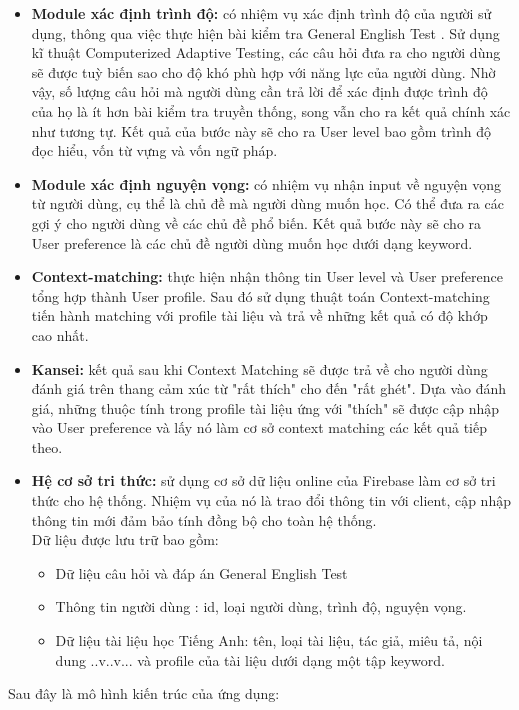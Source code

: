 \begin{itemize}
	\item \textbf{Module xác định trình độ:} có nhiệm vụ xác định trình độ của người sử dụng, thông qua việc thực hiện bài kiểm tra General English Test . Sử dụng kĩ thuật Computerized Adaptive Testing, các câu hỏi đưa ra cho người dùng sẽ được tuỳ biến sao cho độ khó phù hợp với năng lực của người dùng. Nhờ vậy, số lượng câu hỏi mà người dùng cần trả lời để xác định được trình độ của họ là ít hơn bài kiểm tra truyền thống, song vẫn cho ra kết quả chính xác như tương tự. Kết quả của bước này sẽ cho ra User level bao gồm trình độ đọc hiểu, vốn từ vựng và vốn ngữ pháp.
	\item \textbf{Module xác định nguyện vọng:} có nhiệm vụ nhận input về nguyện vọng từ người dùng, cụ thể là chủ đề mà người dùng muốn học. Có thể đưa ra các gợi ý cho người dùng về các chủ đề phổ biến. Kết quả bước này sẽ cho ra User preference là các chủ đề người dùng muốn học dưới dạng keyword.
	\item \textbf{Context-matching:} thực hiện nhận thông tin User level và User preference tổng hợp thành User profile. Sau đó sử dụng thuật toán Context-matching tiến hành matching với profile tài liệu và trả về những kết quả có độ khớp cao nhất.
	\item \textbf{Kansei:} kết quả sau khi Context Matching sẽ được trả về cho người dùng đánh giá trên thang cảm xúc từ "rất thích" cho đến "rất ghét". Dựa vào đánh giá, những thuộc tính trong profile tài liệu ứng với "thích" sẽ được cập nhập vào User preference và lấy nó làm cơ sở context matching các kết quả tiếp theo.
	\item \textbf{Hệ cơ sở tri thức:} sử dụng cơ sở dữ liệu online của Firebase làm cơ sở tri thức cho hệ thống. Nhiệm vụ của nó là trao đổi thông tin với client, cập nhập thông tin mới đảm bảo tính đồng bộ cho toàn hệ thống. \\Dữ liệu được lưu trữ bao gồm:
		\begin{itemize}
			\item Dữ liệu câu hỏi và đáp án General English Test
			\item Thông tin người dùng : id, loại người dùng, trình độ, nguyện vọng.
			\item Dữ liệu tài liệu học Tiếng Anh: tên, loại tài liệu, tác giả, miêu tả, nội dung ..v..v... và profile của tài liệu dưới dạng một tập keyword.
		\end{itemize}
\end{itemize}

Sau đây là mô hình kiến trúc của ứng dụng:

